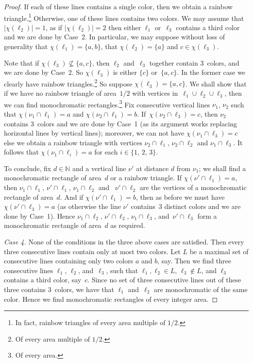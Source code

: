\documentclass[10pt,a4paper]{amsart}
\newcommand{\N}{\mbox{${\mathbb N}$}}
\begin{document}
\begin{proof}
      If each of these lines contains a single color, then we obtain a rainbow triangle.\footnote{{In fact,
      rainbow triangles of every  area multiple of $1/2$}.}
      Otherwise, one of these lines contains two colors.
      We may assume that $\bigl|\chi(\ell_2)\bigr|=1$, %
      as if $\bigl|\chi(\ell_2)\bigr|=2$ then either $\ell_1$ or~$\ell_3$ contains
      a third color and we are done by Case~2.
      In particular, we may suppose without loss of generality that $\chi(\ell_1)=\{a,b\}$, that $\chi(\ell_2)=\{a\}$ and $c\in\chi(\ell_3)$.

      Note that if $\chi(\ell_3)\not\subseteq \{a,c\}$,
      then $\ell_2$ and~$\ell_3$ together contain 3~colors, and we are done by Case~2.
      So $\chi(\ell_3)$ is either $\{c\}$ or~$\{a,c\}$. In the former case we clearly
      have rainbow triangles.\footnote{{Of every  area multiple of $1/2$.}}
      So suppose $\chi(\ell_3)=\{a,c\}$.
      We shall show that if we have no rainbow triangle of area~$1/2$ with vertices in~$\ell_1\cup\ell_2\cup\ell_3$,
      then we can find monochromatic rectangles.\footnote{Of every area.}
      Fix consecutive vertical lines $\nu_1$, $\nu_2$ such that $\chi(\nu_1\cap\ell_1)=a$ and $\chi(\nu_2\cap\ell_1)=b$.
      If~$\chi(\nu_2\cap \ell_3)=c$, then $\nu_2$ contains 3~colors and we are done by Case~1 (as its argument
      works replacing horizontal lines by vertical lines); moreover, we can not have $\chi(\nu_1\cap \ell_3)=c$ else we
      obtain a rainbow triangle with vertices {$\nu_2\cap\ell_1$, $\nu_2\cap \ell_2$} and $\nu_1\cap \ell_3$.
      It follows that {$\chi(\nu_1\cap\ell_i)=a$} for each $i\in\{1,\,2,\,3\}$.

      To conclude, fix $d\in\N$ and a vertical line $\nu'$ at distance $d$ from $\nu_1$;
      we shall find a monochromatic rectangle of area~$d$ or a rainbow triangle.
      If $\chi(\nu'\!\cap\ell_1)=a$, then $\nu_1\cap \ell_1,\,\nu'\!\cap \ell_1,\,\nu_1\cap \ell_2$ and
      ~$\nu'\!\cap \ell_2$ are the vertices
      of a monochromatic rectangle of area~$d$. And if $\chi(\nu'\cap \ell_1)=b$, then as before we must have $\chi(\nu'\cap \ell_3)=a$
      (as otherwise the line $\nu'$ contains~3 distinct colors and we are done by Case~1).
      Hence $\nu_1\cap\ell_2,\,\nu'\!\cap\ell_2,\,\nu_1\cap\ell_3$, and~$\nu'\!\cap\ell_3$ form a monochromatic rectangle of area~$d$ as required.

      \emph{Case 4.} None of the conditions in the three above cases are satisfied. Then every three consecutive lines contain only at most two colors.  Let $L$ be a maximal set of consecutive lines containing only two colors $a$ and $b$, say.  Then we find three consecutive lines $\ell_1,\,\ell_2$, and~$\ell_3$, such that $\ell_1,\ell_2\in L$, $\ell_3\not\in L$, and $\ell_3$ contains a third color, say~$c$. Since no set of three consecutive lines out of these three contains $3$~colors, we have that $\ell_1$ and~$\ell_2$ are monochromatic of the same color. Hence we find monochromatic rectangles of every integer area.
    \end{proof}
\end{document}
